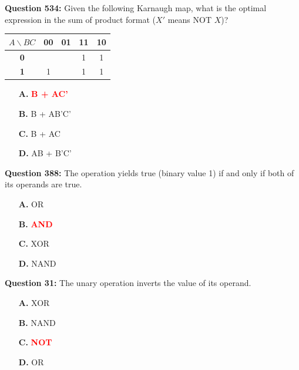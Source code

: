 \documentclass[12pt,a4paper]{article}
\begin{document}
\vspace{0.5cm}

\textbf{Question 534:} Given the following Karnaugh map, what is the optimal expression in the sum of product format ($X'$ means NOT $X$)?

\begin{center}
\renewcommand{\arraystretch}{1.4}
\begin{tabular}{|c|c|c|c|c|}
\hline
$A \backslash BC$ & \textbf{00} & \textbf{01} & \textbf{11} & \textbf{10} \\ \hline
\textbf{0} & & & 1 & 1 \\ \hline
\textbf{1} & 1 & & 1 & 1 \\ \hline
\end{tabular}
\end{center}

\begin{itemize}
    \item[\textbf{A.}] \textcolor{red}{\textbf{B + AC'}}
    \item[\textbf{B.}] B + AB'C'
    \item[\textbf{C.}] B + AC
    \item[\textbf{D.}] AB + B'C'
\end{itemize}

\vspace{0.5cm}

\textbf{Question 388:} The operation \underline{\hspace{1.5cm}} yields true (binary value 1) if and only if both of its operands are true.

\begin{itemize}
    \item[\textbf{A.}] OR
    \item[\textbf{B.}] \textcolor{red}{\textbf{AND}}
    \item[\textbf{C.}] XOR
    \item[\textbf{D.}] NAND
\end{itemize}

\vspace{0.5cm}

\vspace{0.5cm}

\textbf{Question 31:} The unary operation \underline{\hspace{1.5cm}} inverts the value of its operand.

\begin{itemize}
    \item[\textbf{A.}] XOR
    \item[\textbf{B.}] NAND
    \item[\textbf{C.}] \textcolor{red}{\textbf{NOT}}
    \item[\textbf{D.}] OR
\end{itemize}
\end{document}
